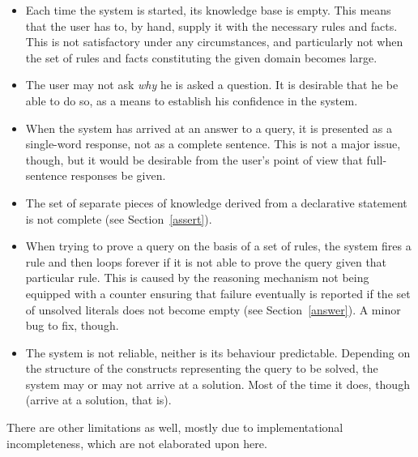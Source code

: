 \begin{itemize}
\item Each time the system is started, its knowledge base is empty.
  This means that the user has to, by hand, supply it with the
  necessary rules and facts. This is not satisfactory under any
  circumstances, and particularly not when the set of rules and facts
  constituting the given domain becomes large.
\item The user may not ask {\em why\/} he is asked a question. It is
  desirable that he be able to do so, as a means to establish his
  confidence in the system.
\item When the system has arrived at an answer to a query, it is
  presented as a single-word response, not as a complete sentence.
  This is not a major issue, though, but it would be desirable from
  the user's point of view that full-sentence responses be given.
\item The set of separate pieces of knowledge derived from a
  declarative statement is not complete (see Section~\ref{assert}).
\item When trying to prove a query on the basis of a set of rules,
  the system fires a rule and then loops forever if it is not able to
  prove the query given that particular rule. This is caused by the
  reasoning mechanism not being equipped with a counter ensuring that
  failure eventually is reported if the set of unsolved literals does
  not become empty (see Section~\ref{answer}). A minor bug to fix,
  though.
\item The system is not reliable, neither is its behaviour
  predictable. Depending on the structure of the constructs
  representing the query to be solved, the system may or may not
  arrive at a solution. Most of the time it does, though (arrive at a
  solution, that is).
\end{itemize}
There are other limitations as well, mostly due to implementational
incompleteness, which are not elaborated upon here.
